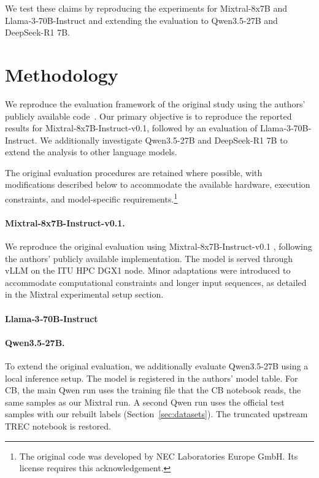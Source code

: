 We test these claims by reproducing the
experiments for Mixtral-8x7B and Llama‐3‐70B‐Instruct
and extending the evaluation to Qwen3.5-27B
and DeepSeek-R1 7B.


\section{Methodology}
We reproduce the evaluation framework of the
original study using the authors' publicly
available code~\cite{original_code}.
Our primary objective is to reproduce the
reported results for Mixtral-8x7B-Instruct-v0.1,
followed by an evaluation of Llama‐3‐70B‐Instruct.
We additionally investigate Qwen3.5-27B
and DeepSeek-R1 7B to extend the analysis
to other language models.

The original evaluation procedures are retained
where possible, with modifications described
below to accommodate the available hardware,
execution constraints, and model-specific
requirements.\footnote{The original code was
developed by NEC Laboratories Europe GmbH.
Its license requires this acknowledgement.}

\paragraph{Mixtral-8x7B-Instruct-v0.1.}
\mbox{}\par
We reproduce the original evaluation using
Mixtral-8x7B-Instruct-v0.1
\cite{mixtral-8x7b-instruct-hf}, following
the authors' publicly available implementation.
The model is served through vLLM on the
ITU HPC DGX1 node. Minor adaptations were
introduced to accommodate computational
constraints and longer input sequences,
as detailed in the Mixtral experimental
setup section.

\paragraph{Llama‐3‐70B‐Instruct}
\mbox{}\par
[same as Mixtral]

\paragraph{Qwen3.5-27B.}
\mbox{}\par
To extend the original evaluation, we
additionally evaluate Qwen3.5-27B using
a local inference setup. The model is
registered in the authors' model table.
For CB, the main Qwen run uses the
training file that the CB notebook reads,
the same samples as our Mixtral run. A
second Qwen run uses the official test
samples with our rebuilt labels
(Section~\ref{sec:datasets}). The
truncated upstream TREC notebook is
restored.


